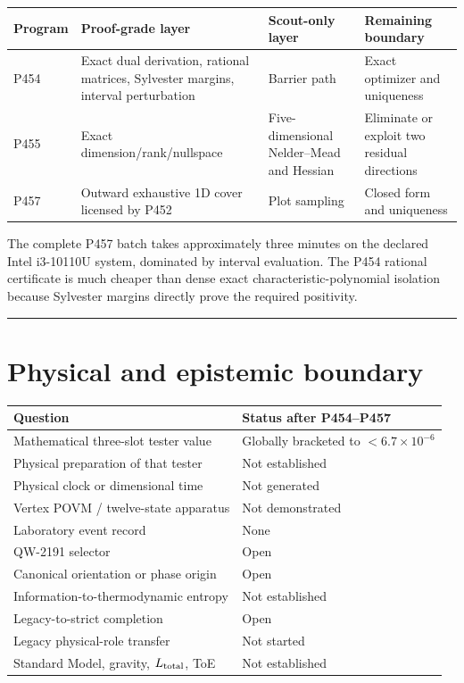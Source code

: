 \documentclass[11pt,a4paper,openany]{report}
\begin{document}
\begin{center}
\begingroup\small
\setlength{\tabcolsep}{2.5pt}
\renewcommand{\arraystretch}{1.16}
\begin{longtable}{@{}p{}p{}p{}p{}@{}}
\toprule
\textbf{Program} & \textbf{Proof-grade layer} & \textbf{Scout-only layer} & \textbf{Remaining boundary} \\
\midrule
\endhead
P454 & Exact dual derivation, rational matrices, Sylvester margins, interval perturbation & Barrier path & Exact optimizer and uniqueness \\
P455 & Exact dimension/\allowbreak{}rank/\allowbreak{}nullspace & Five-dimensional Nelder--Mead and Hessian & Eliminate or exploit two residual directions \\
P457 & Outward exhaustive 1D cover licensed by P452 & Plot sampling & Closed form and uniqueness \\
\bottomrule
\end{longtable}
\endgroup
\end{center}

The complete P457 batch takes approximately three minutes on the declared Intel i3-10110U system, dominated by interval evaluation. The P454 rational certificate is much cheaper than dense exact characteristic-polynomial isolation because Sylvester margins directly prove the required positivity.

\par\medskip\hrule\medskip

\chapter{Physical and epistemic boundary}

\begin{center}
\begingroup\small
\setlength{\tabcolsep}{2.5pt}
\renewcommand{\arraystretch}{1.16}
\begin{longtable}{@{}p{}p{}@{}}
\toprule
\textbf{Question} & \textbf{Status after P454--P457} \\
\midrule
\endhead
Mathematical three-slot tester value & Globally bracketed to \(<6.7\times10^{-6}\) \\
Physical preparation of that tester & Not established \\
Physical clock or dimensional time & Not generated \\
Vertex POVM /\allowbreak{} twelve-state apparatus & Not demonstrated \\
Laboratory event record & None \\
QW-2191 selector & Open \\
Canonical orientation or phase origin & Open \\
Information-to-thermodynamic entropy & Not established \\
Legacy-to-strict completion & Open \\
Legacy physical-role transfer & Not started \\
Standard Model, gravity, \(L_{\rm total}\), ToE & Not established \\
\bottomrule
\end{longtable}
\endgroup
\end{center}
\end{document}
